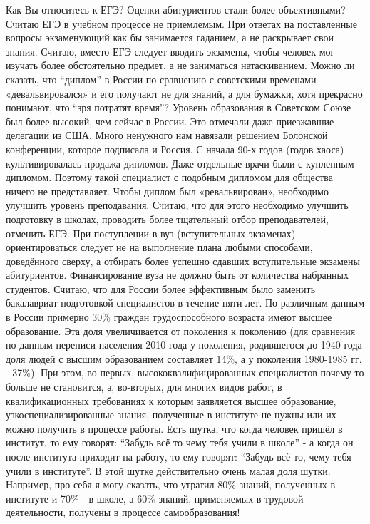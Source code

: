 \begin{drama}
	\maxspeaks Как Вы относитесь к ЕГЭ? Оценки абитуриентов стали более объективными?
	\michaelspeaks Считаю ЕГЭ в учебном процессе не приемлемым. При ответах на поставленные вопросы экзаменующий как бы занимается гаданием, а не раскрывает свои знания. Считаю, вместо ЕГЭ следует вводить экзамены, чтобы человек мог изучать более обстоятельно предмет, а не заниматься натаскиванием.
	\maxspeaks Можно ли сказать, что “диплом” в России по сравнению с советскими временами «девальвировался» и его получают не для знаний, а для бумажки, хотя прекрасно понимают, что “зря потратят время”?
	\michaelspeaks Уровень образования в Советском Союзе был более высокий, чем сейчас в России. Это отмечали даже приезжавшие делегации из США. Много ненужного нам навязали решением Болонской конференции, которое подписала и Россия. С начала 90-х годов (годов хаоса) культивировалась продажа дипломов. Даже отдельные врачи были с купленным дипломом. Поэтому такой специалист с подобным дипломом для общества ничего не представляет. Чтобы диплом был «ревальвирован», необходимо улучшить уровень преподавания. Считаю, что для этого необходимо улучшить подготовку в школах, проводить более тщательный отбор преподавателей, отменить ЕГЭ. При поступлении в вуз (вступительных экзаменах) ориентироваться следует не на выполнение плана любыми способами, доведённого сверху, а отбирать более успешно сдавших вступительные экзамены абитуриентов. Финансирование вуза не должно быть от количества набранных студентов. Считаю, что для России более эффективным было заменить бакалавриат подготовкой специалистов в течение пяти лет.
	\maxspeaks По различным данным в России примерно 30\% граждан трудоспособного возраста имеют высшее образование. Эта доля увеличивается от поколения к поколению (для сравнения по данным переписи населения 2010 года у поколения, родившегося до 1940 года доля людей с высшим образованием составляет 14\%, а у поколения 1980-1985 гг. - 37\%). При этом, во-первых, высококвалифицированных специалистов почему-то больше не становится, а, во-вторых, для многих видов работ, в квалификационных требованиях к которым заявляется высшее образование, узкоспециализированные знания, полученные в институте не нужны или их можно получить в процессе работы. 
Есть шутка, что когда человек пришёл в институт, то ему говорят: “Забудь всё то чему тебя учили в школе” - а когда он после института приходит на работу, то ему говорят: “Забудь всё то, чему тебя учили в институте”. В этой шутке действительно очень малая доля шутки. Например, про себя я могу сказать, что утратил 80\% знаний, полученных в институте и 70\% - в школе, а 60\% знаний, применяемых в трудовой деятельности, получены в процессе самообразования!

\end{drama}
